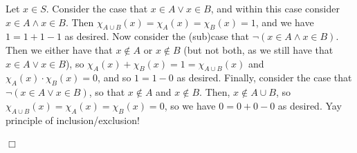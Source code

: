 \documentclass[12pt]{article}
\theoremstyle{definition}
\newenvironment{Solution}{\noindent {\sc Solution.}}{$\Box$ \vspace{2 ex}}
\begin{document}
\begin{Solution}
\begin{enumerate}[(a)]
    Let $x \in S$. Consider the case that $x \in A \lor x \in B$, and within this case consider $x \in A \land x \in B$. Then $\chi_{A\cup B}(x) = \chi_A(x)=\chi_B(x)= 1$, and we have $1 = 1 + 1 - 1$ as desired. Now consider the (sub)case that $\lnot(x \in A \land x\in B)$. Then we either have that $x \not\in A$ or $x \not\in B$ (but not both, as we still have that $x \in A \lor x \in B$), so $\chi_A(x)+\chi_B(x)=1=\chi_{A\cup B}(x)$ and $\chi_A(x)\cdot\chi_B(x)=0$, and so $1 = 1 - 0$ as desired. Finally, consider the case that $\lnot(x \in A \lor x\in B)$, so that $x\not\in A$ and $x \not\in B$. Then, $x \not\in A \cup B$, so $\chi_{A\cup B}(x)=\chi_A(x)=\chi_B(x)=0$, so we have $0 = 0+0-0$ as desired.
    Yay principle of inclusion/exclusion!
\end{enumerate}
\end{Solution}

\vspace{0.5cm}
\end{document}

